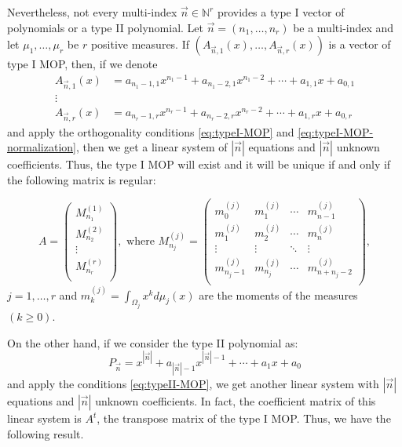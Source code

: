 \documentclass[12pt,a4]{report}
\theoremstyle{plain}
\newcommand{\N}[0]{\mathbb{N}}
\begin{document}
Nevertheless, not every multi-index $\vec n\in\N^r$ provides a type I vector of polynomials or a type II polynomial. Let $\vec n = (n_1,\dots,n_r)$ be a multi-index and let $\mu_1,\dots,\mu_r$ be $r$ positive measures. If $(A_{\vec n, 1}(x), \dots, A_{\vec n, r}(x))$ is a vector of type I MOP, then, if we denote
\begin{equation}
    \begin{split}
        A_{\vec n,1}(x) &= a_{n_1-1,1}x^{n_1-1} + a_{n_1-2,1}x^{n_1-2} + \cdots + a_{1,1}x + a_{0,1} \\
        \vdots & \\
        A_{\vec n,r}(x) &= a_{n_r-1,r}x^{n_r-1} + a_{n_r-2,r}x^{n_r-2} + \cdots + a_{1,r}x + a_{0,r}
    \end{split}
\end{equation}
and apply the orthogonality conditions \eqref{eq:typeI-MOP} and \eqref{eq:typeI-MOP-normalization}, then we get a linear system of $|\vec n|$ equations and $|\vec n|$ unknown coefficients. Thus, the type I MOP will exist and it will be unique if and only if the following matrix is regular:

\begin{equation}
    \label{eq:MOP-matrix}
    A=\left(\begin{array}{c}
    M_{n_1}^{(1)} \\ \hline
    M_{n_2}^{(2)} \\ \hline
    \vdots \\ \hline
    M_{n_r}^{(r)} \\ 
\end{array}\right), \text{ \ \  where \ \ } M_{n_j}^{(j)} = \begin{pmatrix}
    m_0^{(j)} & m_1^{(j)} & \cdots & m_{n-1}^{(j)} \\
    m_1^{(j)} & m_2^{(j)} & \cdots & m_{n}^{(j)} \\
    \vdots & \vdots & \ddots & \vdots \\
    m_{n_j-1}^{(j)} & m_{n_j}^{(j)} & \cdots & m_{n+n_j-2}^{(j)} \\
\end{pmatrix},
\end{equation}
$j=1,\dots,r$ and $m_k^{(j)}=\displaystyle\int_{\Omega_j} x^k d\mu_j(x)$ are the moments of the measures $(k\geq 0)$.

On the other hand, if we consider the type II polynomial as:
$$
P_{\vec n} = x^{|\vec n|} + a_{|\vec n|-1} x^{|\vec n|-1} + \cdots + a_1 x + a_0
$$
and apply the conditions \eqref{eq:typeII-MOP}, we get another linear system with $|\vec n|$ equations and $|\vec n|$ unknown coefficients. In fact, the coefficient matrix of this linear system is $A^t$, the transpose matrix of the type I MOP. Thus, we have the following result.
\end{document}
